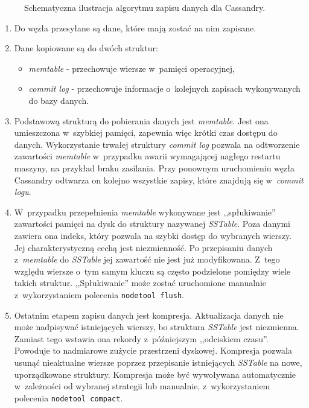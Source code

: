 \begin{figure}[ht!]
	\caption{Schematyczna ilustracja algorytmu zapisu danych dla Cassandry.}
	\label{fig:cassandra_data_store_diagram}
\end{figure}

\begin{enumerate}
	\item Do węzła przesyłane są dane, które mają zostać na nim zapisane. 
	\item Dane kopiowane są do dwóch struktur:
		\begin{itemize}
			\item \emph{memtable} - przechowuje wiersze w~pamięci operacyjnej,
			\item \emph{commit log} - przechowuje informacje o~kolejnych zapisach wykonywanych do bazy danych.
		\end{itemize}
	\item Podstawową strukturą do pobierania danych jest \emph{memtable}. Jest ona umieszczona w~szybkiej pamięci, zapewnia więc krótki czas dostępu do danych. Wykorzystanie trwałej struktury \emph{commit log} pozwala na odtworzenie zawartości \emph{memtable} w~przypadku awarii wymagającej nagłego restartu maszyny, na przykład braku zasilania. Przy ponownym uruchomieniu węzła Cassandry odtwarza on kolejno wszystkie zapisy, które znajdują się w~\emph{commit logu}.
	\item W~przypadku przepełnienia \emph{memtable} wykonywane jest ,,spłukiwanie'' zawartości pamięci na dysk do struktury nazywanej \emph{SSTable}. Poza danymi zawiera ona indeks, który pozwala na szybki dostęp do wybranych wierszy. Jej charakterystyczną cechą jest niezmienność. Po przepisaniu danych z~\emph{memtable} do \emph{SSTable} jej zawartość nie jest już modyfikowana. Z~tego względu wiersze o~tym samym kluczu są często podzielone pomiędzy wiele takich struktur. ,,Spłukiwanie'' może zostać uruchomione manualnie z~wykorzystaniem polecenia \verb+nodetool flush+.
	\item Ostatnim etapem zapisu danych jest kompresja. Aktualizacja danych nie może nadpisywać istniejących wierszy, bo struktura \emph{SSTable} jest niezmienna. Zamiast tego wstawia ona rekordy z~późniejszym ,,odciskiem czasu''. Powoduje to nadmiarowe zużycie przestrzeni dyskowej. Kompresja pozwala usunąć nieaktualne wiersze poprzez przepisanie istniejących \emph{SSTable} na nowe, uporządkowane struktury. Kompresja może być wywoływana automatycznie w~zależności od wybranej strategii lub manualnie, z~wykorzystaniem polecenia \verb+nodetool compact+.
\end{enumerate}

